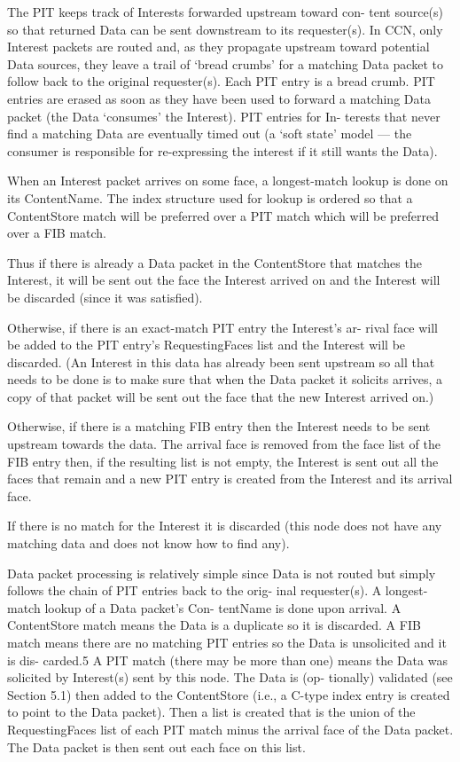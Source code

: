 \par
The PIT keeps track of Interests forwarded upstream toward con- tent source(s) so that returned Data can be sent downstream to its requester(s). In CCN, only Interest packets are routed and, as they propagate upstream toward potential Data sources, they leave a trail of ‘bread crumbs’ for a matching Data packet to follow back to the original requester(s). Each PIT entry is a bread crumb. PIT entries are erased as soon as they have been used to forward a matching Data packet (the Data ‘consumes’ the Interest). PIT entries for In- terests that never find a matching Data are eventually timed out (a ‘soft state’ model — the consumer is responsible for re-expressing the interest if it still wants the Data).
\par
When an Interest packet arrives on some face, a longest-match lookup is done on its ContentName. The index structure used for lookup is ordered so that a ContentStore match will be preferred over a PIT match which will be preferred over a FIB match.
\par
Thus if there is already a Data packet in the ContentStore that matches the Interest, it will be sent out the face the Interest arrived on and the Interest will be discarded (since it was satisfied).
\par
Otherwise, if there is an exact-match PIT entry the Interest’s ar- rival face will be added to the PIT entry’s RequestingFaces list and the Interest will be discarded. (An Interest in this data has already been sent upstream so all that needs to be done is to make sure that when the Data packet it solicits arrives, a copy of that packet will be sent out the face that the new Interest arrived on.)
\par
Otherwise, if there is a matching FIB entry then the Interest needs to be sent upstream towards the data. The arrival face is removed from the face list of the FIB entry then, if the resulting list is not empty, the Interest is sent out all the faces that remain and a new PIT entry is created from the Interest and its arrival face.
\par
If there is no match for the Interest it is discarded (this node does not have any matching data and does not know how to find any).
\par
Data packet processing is relatively simple since Data is not routed but simply follows the chain of PIT entries back to the orig- inal requester(s). A longest-match lookup of a Data packet’s Con- tentName is done upon arrival. A ContentStore match means the Data is a duplicate so it is discarded. A FIB match means there are no matching PIT entries so the Data is unsolicited and it is dis- carded.5 A PIT match (there may be more than one) means the Data was solicited by Interest(s) sent by this node. The Data is (op- tionally) validated (see Section 5.1) then added to the ContentStore (i.e., a C-type index entry is created to point to the Data packet). Then a list is created that is the union of the RequestingFaces list of each PIT match minus the arrival face of the Data packet. The Data packet is then sent out each face on this list.
